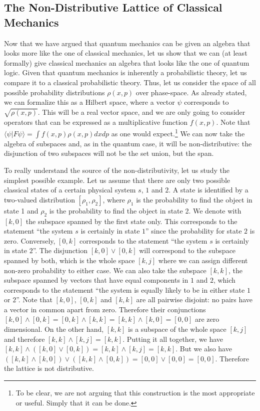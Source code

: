 \documentclass[11pt, executivepaper]{article}
\begin{document}
\subsection{The Non-Distributive Lattice of Classical Mechanics}

Now that we have argued that quantum mechanics can be given an algebra that looks more like the one of classical mechanics, let us show that we can (at least formally) give classical mechanics an algebra that looks like the one of quantum logic. Given that quantum mechanics is inherently a probabilistic theory, let us compare it to a classical probabilistic theory. Thus, let us consider the space of all possible probability distributions $\rho(x,p)$ over phase-space. As already stated, we can formalize this as a Hilbert space, where a vector $\psi$ corresponds to $\sqrt{\rho(x,p)}$. This will be a real vector space, and we are only going to consider operators that can be expressed as a multiplicative function $f(x,p)$. Note that $\langle \psi | F \psi \rangle = \int f(x,p) \rho(x,p) dx dp$ as one would expect.\footnote{To be clear, we are not arguing that this construction is the most appropriate or useful. Simply that it can be done.}  We can now take the algebra of subspaces and, as in the quantum case, it will be non-distributive: the disjunction of two subspaces will not be the set union, but the span.

To really understand the source of the non-distributivity, let us study the simplest possible example. Let us assume that there are only two possible classical states of a certain physical system $s$, $1$ and $2$. A state is identified by a two-valued distribution $[\rho_1, \rho_2]$, where $\rho_1$ is the probability to find the object in state 1 and $\rho_2$ is the probability to find the object in state 2. We denote with $[k,0]$ the subspace spanned by the first state only. This corresponds to the statement ``the system $s$ is certainly in state $1$'' since the probability for state $2$ is zero. Conversely, $[0,k]$ corresponds to the statement ``the system $s$ is certainly in state $2$''. The disjunction $[k,0] \vee [0,k]$ will correspond to the subspace spanned by both, which is the whole space $[k,j]$ where we can assign different non-zero probability to either case. We can also take the subspace $[k,k]$, the subspace spanned by vectors that have equal components in $1$ and $2$, which corresponds to the statement ``the system is equally likely to be in either state $1$ or $2$''. Note that $[k,0]$, $[0,k]$ and $[k,k]$ are all pairwise disjoint: no pairs have a vector in common apart from zero. Therefore their conjunctions $[k,0] \wedge [0,k] = [0,k] \wedge [k,k] = [k,k] \wedge [k,0] = [0,0]$ are zero dimensional. On the other hand, $[k,k]$ is a subspace of the whole space $[k,j]$ and therefore $[k,k] \wedge [k,j] = [k,k]$. Putting it all together, we have $[k,k] \wedge ( [k,0] \vee [0,k] ) = [k,k] \wedge [k,j] = [k,k]$. But we also have $( [k,k] \wedge [k,0] ) \vee ( [k,k] \wedge [0,k] ) = [0,0] \vee [0,0] = [0,0]$. Therefore the lattice is not distributive.
\end{document}
